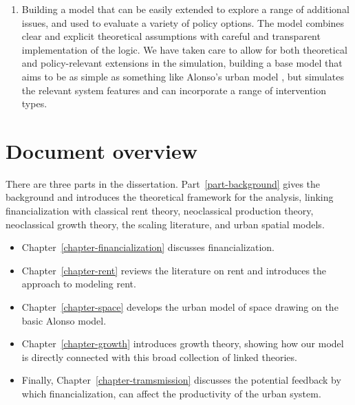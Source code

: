 \begin{enumerate}

    \item Building a model that can be easily extended to explore a range of additional issues, and used to evaluate a variety of policy options. The model combines clear and explicit theoretical assumptions with careful and transparent implementation of the logic. We have taken care to allow for both theoretical and policy-relevant extensions in the simulation,  building a base model that aims to be as simple as something like Alonso's urban model \cite{alonsoLocationLandUse1964}, but simulates the relevant system features and can incorporate a range of intervention types. 
\end{enumerate}


\section{Document overview}
There are three parts in the dissertation. Part~\ref{part-background} gives the background and introduces the theoretical framework for the analysis, linking financialization with classical rent theory, neoclassical production theory, neoclassical growth theory, the scaling literature, and urban spatial models. 

\begin{itemize}
    \item Chapter~\ref{chapter-financialization} discusses financialization.

    \item Chapter~\ref{chapter-rent} reviews the literature on rent and introduces the approach to modeling rent. %

    \item Chapter~\ref{chapter-space} develops the urban model of space drawing on the basic Alonso model.

    \item Chapter~\ref{chapter-growth} introduces growth theory, showing how our model is directly connected with this broad collection of linked theories. 

    \item Finally, Chapter~\ref{chapter-tramsmission} discusses the potential feedback by which financialization, can affect the productivity of the urban system. %
\end{itemize}
 
